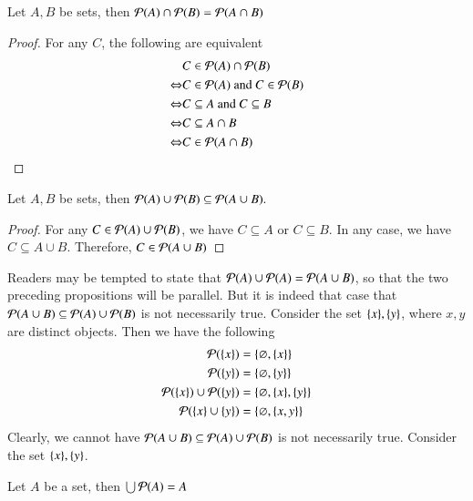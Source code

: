 \begin{prop}
    Let $A,B$ be sets, then $\mathcal{P}(A)\cap \mathcal{P}(B) = \mathcal{P}(A\cap B)$ 
\end{prop}
\begin{proof}
    For any $C$, the following are equivalent 
    \begin{align*}
        & C\in\mathcal{P}(A)\cap \mathcal{P}(B)\\
        \Leftrightarrow & C\in\mathcal{P}(A)\text{ and } C\in\mathcal{P}(B)\\
        \Leftrightarrow & C\subseteq A\text{ and } C\subseteq B\\
        \Leftrightarrow & C\subseteq A\cap B\\
        \Leftrightarrow & C\in\mathcal{P}(A\cap B)
    \end{align*}
\end{proof}
\begin{prop}
    Let $A,B$ be sets, then $\mathcal{P}(A)\cup\mathcal{P}(B)\subseteq \mathcal{P}(A\cup B).$
\end{prop}
\begin{proof}
    For any $C\in\mathcal{P}(A)\cup\mathcal{P}(B)$, we have $C\subseteq A$ or $C\subseteq B$. In any case, we have $C\subseteq A\cup B$. Therefore, $C\in\mathcal{P}(A\cup B)$
\end{proof}
\begin{rem}
    Readers may be tempted to state that $\mathcal{P}(A)\cup\mathcal{P}(A) = \mathcal{P}(A\cup B)$, so that the two preceding propositions will be parallel. But it is indeed that case that $\mathcal{P}(A\cup B)\subseteq \mathcal{P}(A)\cup \mathcal{P}(B)$ is not necessarily true. Consider the set $\{x\},\{y\}$, where $x,y$ are distinct objects. Then we have the following 
    \begin{align*}
        \mathcal{P}(\{x\}) &= \{\varnothing, \{x\}\} \\
        \mathcal{P}(\{y\}) &= \{\varnothing, \{y\}\} \\
        \mathcal{P}(\{x\})\cup\mathcal{P}(\{y\}) &= \{\varnothing, \{x\},\{y\}\} \\
        \mathcal{P}(\{x\} \cup\{y\}) &= \{\varnothing, \{x,y\}\}
    \end{align*}
    Clearly, we cannot have $\mathcal{P}(A\cup B)\subseteq \mathcal{P}(A)\cup \mathcal{P}(B)$ is not necessarily true. Consider the set $\{x\},\{y\}$.
\end{rem}
\begin{prop}
    Let $A$ be a set, then $\bigcup \mathcal{P}(A) = A$
\end{prop}

